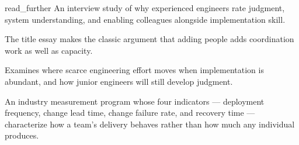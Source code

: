 \begin{bookbox}{read_further}{} %
\citep{li2015great} An interview study of why experienced engineers rate judgment, system understanding, and enabling colleagues alongside implementation skill.

\citep{brooks1995} The title essay makes the classic argument that adding people adds coordination work as well as capacity.

\citep[Part 7, ``The Profession,'' §§7.1 and 7.4]{davis2026mage} Examines where scarce engineering effort moves when implementation is abundant, and how junior engineers will still develop judgment.

\citep{dora-metrics} An industry measurement program whose four indicators --- deployment frequency, change lead time, change failure rate, and recovery time --- characterize how a team's delivery behaves rather than how much any individual produces.
\end{bookbox}
